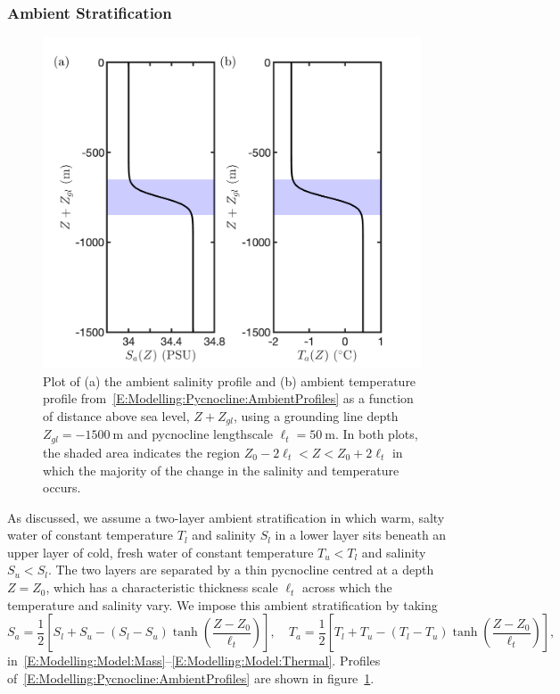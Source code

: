 \documentclass[openacc]{rsproca_new}%
\begin{document}
\subsubsection{Ambient Stratification}\label{S:Model:Pycnocline}
\begin{figure}
\centering
\includegraphics[scale =0.4]{Submitted_PRSA/make_plots/plots/figure2.png}
\caption{Plot of (a) the ambient salinity profile and (b) ambient temperature profile from~\eqref{E:Modelling:Pycnocline:AmbientProfiles} as a function of distance above sea level, $Z + Z_{gl}$, using a grounding line depth $Z_{gl} = -1500~\si{\meter}$ and pycnocline lengthscale $\ell_t = 50~\si{\meter}$. In both plots, the shaded area indicates the region $Z_0 - 2\ell_t < Z < Z_0 + 2\ell_t$ in which the majority of the change in the salinity and temperature occurs.}\label{fig:Pycnocline_Profiles}
\end{figure}

As discussed, we assume a two-layer ambient stratification in which warm, salty water of constant temperature $T_l$ and salinity $S_l$ in a lower layer sits beneath an upper layer of cold, fresh water of constant temperature $T_u < T_l$ and salinity $S_u < S_l$. The two layers are separated by a thin pycnocline centred at a depth $Z = Z_0$, which has a characteristic thickness scale $\ell_t$ across which the temperature and salinity vary. We impose this ambient stratification by taking
\begin{equation}\label{E:Modelling:Pycnocline:AmbientProfiles}
S_a = \frac{1}{2}\left[S_l + S_u - (S_l - S_u)\tanh\left(\frac{Z - Z_0}{\ell_t}\right)\right], \quad
T_a = \frac{1}{2}\left[T_l + T_u - (T_l - T_u)\tanh\left(\frac{Z - Z_0}{\ell_t}\right)\right],
\end{equation} %
in~\eqref{E:Modelling:Model:Mass}--\eqref{E:Modelling:Model:Thermal}. Profiles of~\eqref{E:Modelling:Pycnocline:AmbientProfiles} are shown in figure~\ref{fig:Pycnocline_Profiles}. 
\end{document}
